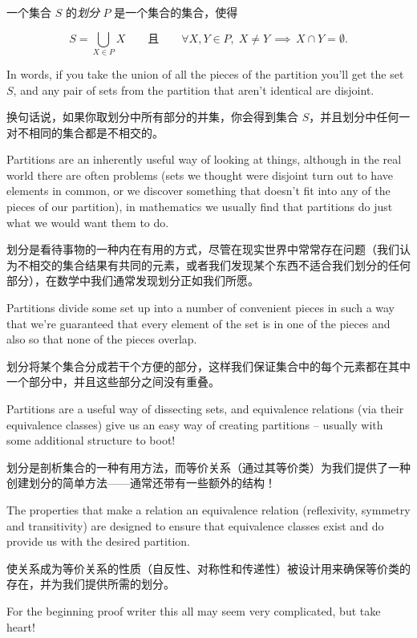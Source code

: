 \begin{defi} 一个集合 $S$ 的\emph{划分} $P$ 是一个集合的集合，使得

\[ S = \bigcup_{X \in P} X \qquad \mbox{且} \qquad %
\forall X, Y \in P, \;
X \neq Y \, \implies \, X \cap Y = \emptyset.
\]

\end{defi}
 
In words, if you take the union of all the pieces of the partition you'll get the
set $S$, and any pair of sets from the partition that aren't identical are disjoint.

换句话说，如果你取划分中所有部分的并集，你会得到集合 $S$，并且划分中任何一对不相同的集合都是不相交的。

Partitions are an inherently useful way of looking at things, although in the real world
there are often problems (sets we thought were disjoint turn out to have elements in common,
or we discover something that doesn't fit into any of the pieces of our partition), in
mathematics we usually find that partitions do just what we would want them to do.

划分是看待事物的一种内在有用的方式，尽管在现实世界中常常存在问题（我们认为不相交的集合结果有共同的元素，或者我们发现某个东西不适合我们划分的任何部分），在数学中我们通常发现划分正如我们所愿。

Partitions divide some set up into a number of convenient pieces in such a way that we're
guaranteed that every element of the set is in one of the pieces and also so that none of
the pieces overlap.

划分将某个集合分成若干个方便的部分，这样我们保证集合中的每个元素都在其中一个部分中，并且这些部分之间没有重叠。

Partitions are a useful way of dissecting sets, and equivalence relations
(via their equivalence classes) give us an easy way of creating partitions --
usually with some additional structure to boot!

划分是剖析集合的一种有用方法，而等价关系（通过其等价类）为我们提供了一种创建划分的简单方法——通常还带有一些额外的结构！

The 
properties that make a relation an equivalence relation (reflexivity, symmetry and 
transitivity) are designed to ensure that equivalence classes exist and do provide us
with the desired partition.

使关系成为等价关系的性质（自反性、对称性和传递性）被设计用来确保等价类的存在，并为我们提供所需的划分。

For the beginning proof writer this all may seem very complicated,
but take heart!

